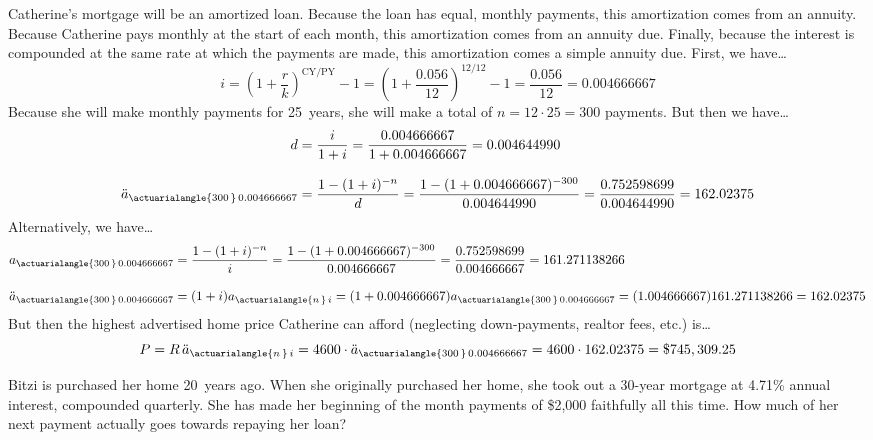 \documentclass[11pt,letterpaper]{article}
\begin{document}
\sol Catherine's mortgage will be an amortized loan. Because the loan has equal, monthly payments, this amortization comes from an annuity. Because Catherine pays monthly at the start of each month, this amortization comes from an annuity due. Finally, because the interest is compounded at the same rate at which the payments are made, this amortization comes a simple annuity due. First, we have\dots
	\[
	i= \left(1 + \dfrac{r}{k} \right)^{\text{CY}/\text{PY}} - 1= \left(1 + \dfrac{0.056}{12} \right)^{\text{12}/\text{12}} - 1= \dfrac{0.056}{12}= 0.004666667
	\]
Because she will make monthly payments for 25~years, she will make a total of $n= 12 \cdot 25= 300$ payments. But then we have\dots
	\[
	\begin{aligned}
	d&= \dfrac{i}{1 + i}= \dfrac{0.004666667}{1 + 0.004666667}= 0.004644990 \\[0.3cm]
	\ddot{a}_{\actuarialangle{300\,}\, 0.004666667}&= \dfrac{1 - (1 + i)^{-n}}{d}= \dfrac{1 - (1 + 0.004666667)^{-300}}{0.004644990}= \dfrac{0.752598699}{0.004644990}= 162.02375
	\end{aligned}
	\]
Alternatively, we have\dots
	\[
	\begin{aligned}
	a_{\actuarialangle{300\,}\, 0.004666667}&= \dfrac{1 - (1 + i)^{-n}}{i}= \dfrac{1 - (1 + 0.004666667)^{-300}}{0.004666667}= \dfrac{0.752598699}{0.004666667}= 161.271138266 \\[0.3cm]
	\ddot{a}_{\actuarialangle{300\,}\, 0.004666667}&= (1 + i) a_{\actuarialangle{n\,}\, i}= (1 + 0.004666667) a_{\actuarialangle{300\,}\, 0.004666667}= (1.004666667) 161.271138266= 162.02375
	\end{aligned}
	\]
But then the highest advertised home price Catherine can afford (neglecting down-payments, realtor fees, etc.) is\dots
	\[
	P= R\,\ddot{a}_{\actuarialangle{n\,}\, i}= 4600 \cdot \ddot{a}_{\actuarialangle{300\,}\, 0.004666667}= 4600 \cdot 162.02375= \$745,309.25
	\]



\newpage 



 Bitzi is purchased her home 20~years ago. When she originally purchased her home, she took out a 30-year mortgage at 4.71\% annual interest, compounded quarterly. She has made her beginning of the month payments of \$2,000 faithfully all this time. How much of her next payment actually goes towards repaying her loan? \pspace
\end{document}

